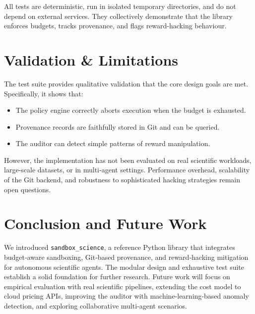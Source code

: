 \documentclass[11pt,a4paper]{article}
\begin{document}
All tests are deterministic, run in isolated temporary directories, and do not depend on external services. They collectively demonstrate that the library enforces budgets, tracks provenance, and flags reward‑hacking behaviour.

\section{Validation \& Limitations}
The test suite provides qualitative validation that the core design goals are met. Specifically, it shows that:
\begin{itemize}
    \item The policy engine correctly aborts execution when the budget is exhausted.
    \item Provenance records are faithfully stored in Git and can be queried.
    \item The auditor can detect simple patterns of reward manipulation.
\end{itemize}
However, the implementation has not been evaluated on real scientific workloads, large‑scale datasets, or in multi‑agent settings. Performance overhead, scalability of the Git backend, and robustness to sophisticated hacking strategies remain open questions.

\section{Conclusion and Future Work}
We introduced \texttt{sandbox\_science}, a reference Python library that integrates budget‑aware sandboxing, Git‑based provenance, and reward‑hacking mitigation for autonomous scientific agents. The modular design and exhaustive test suite establish a solid foundation for further research. Future work will focus on empirical evaluation with real scientific pipelines, extending the cost model to cloud pricing APIs, improving the auditor with machine‑learning‑based anomaly detection, and exploring collaborative multi‑agent scenarios.



\end{document}
